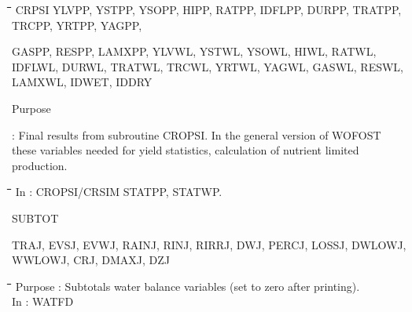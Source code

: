\nwln
\begin{tabbing}
\hspace{1.27cm}\=\hspace{1.27cm}\=\hspace{1.27cm}\=\hspace{1.27cm}\=%
\hspace{1.27cm}\=\hspace{1.27cm}\=\hspace{1.27cm}\=\hspace{1.27cm}\=%
\hspace{1.27cm}\=\hspace{1.27cm}\=\kill
CRPSI\>  YLVPP, YSTPP, YSOPP, HIPP, RATPP, IDFLPP, DURPP, TRATPP, TRCPP, YRTPP, YAGPP,
\end{tabbing}
GASPP, RESPP, LAMXPP, YLVWL, YSTWL, YSOWL, HIWL, RATWL, IDFLWL, DURWL,
TRATWL, TRCWL, YRTWL, YAGWL, GASWL, RESWL, LAMXWL, IDWET, IDDRY
\hspace*{1.28cm}
\testlastline

\begin{indenting}{2.54cm}
Purpose
\end{indenting}
\begin{indenting}{3.81cm}
: Final results from subroutine CROPSI. In the general version of WOFOST these variables 
  needed for yield statistics, calculation of nutrient limited production.
\end{indenting}
\begin{tabbing}
\hspace{1.27cm}\=\hspace{1.27cm}\=\hspace{1.27cm}\=\hspace{1.27cm}\=%
\hspace{1.27cm}\=\hspace{1.27cm}\=\hspace{1.27cm}\=\hspace{1.27cm}\=%
\hspace{1.27cm}\=\hspace{1.27cm}\=\kill
\>\> In : CROPSI/CRSIM STATPP, STATWP.
\end{tabbing}

\bigskip
SUBTOT
\testlastline

\begin{indenting}{2.54cm}
TRAJ, EVSJ, EVWJ, RAINJ, RINJ, RIRRJ, DWJ, PERCJ, LOSSJ, DWLOWJ, WWLOWJ, CRJ,
DMAXJ, DZJ
\end{indenting}
\begin{tabbing}
\hspace{1.27cm}\=\hspace{1.27cm}\=\hspace{1.27cm}\=\hspace{1.27cm}\=%
\hspace{1.27cm}\=\hspace{1.27cm}\=\hspace{1.27cm}\=\hspace{1.27cm}\=%
\hspace{1.27cm}\=\hspace{1.27cm}\=\kill
\>\> Purpose\> : Subtotals water balance variables (set to zero after printing).\\
\>\> In\> : WATFD
\end{tabbing}

